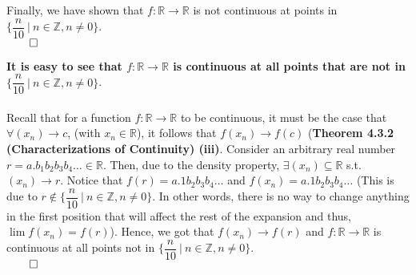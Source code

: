 \documentclass[11pt]{article}
\newcommand{\reals}{\mathbb{R}}
\newcommand{\ints}{\mathbb{Z}}
\begin{document}
\begin{itemize}
        Finally, we have shown that $f : \reals \to \reals$ is not continuous
        at points in $\Big\{\dfrac{n}{10} \ \big| \ n \in \ints, n \neq 0
        \Big\}$.\\
        $\qed$

        \textbf{It is easy to see that $f : \reals \to \reals$ is continuous at
        all points that are not in $\Big\{\dfrac{n}{10} \ \big| \ n \in \ints,
        n \neq 0 \Big\}$}.
        \\
        \\
        Recall that for a function $f : \reals \to \reals$ to be continuous, it
        must be the case that $\forall (x_n) \to c$, (with $x_n \in \reals$),
        it follows that $f(x_n) \to f(c)$ (\textbf{Theorem 4.3.2
        (Characterizations of Continuity) (iii)}. Consider an arbitrary real
        number $r = a.b_1b_2b_3b_4\dots \in \reals$. Then, due to the density
        property, $\exists (x_n) \subseteq \reals$ s.t. $(x_n) \to r$. Notice
        that $f(r) = a.1b_2b_3b_4\dots$ and $f(x_n) = a.1b_2b_3b_4\dots$ (This
        is due to $r \notin \Big\{\dfrac{n}{10} \ \big| \ n \in \ints, n \neq 0
        \Big\}$. In other words, there is no way to change anything in the
        first position that will affect the rest of the expansion and thus,
        $\lim{f(x_n)} = f(r)$). Hence, we got that $f(x_n) \to f(r)$ and $f :
        \reals \to \reals$ is continuous at all points not in
        $\Big\{\dfrac{n}{10} \ \big| \ n \in \ints, n \neq 0 \Big\}$.\\
        $\qed$


\end{itemize}
\end{document}
